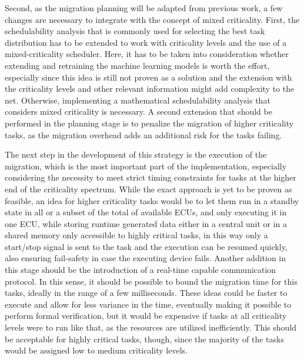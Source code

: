 Second, as the migration planning will be adapted from previous work, a few changes are necessary to integrate with the concept of mixed criticality. First, the schedulability analysis that is commonly used for selecting the best task distribution has to be extended to work with criticality levels and the use of a mixed-criticality scheduler. Here, it has to be taken into consideration whether extending and retraining the machine learning models is worth the effort, especially since this idea is still not proven as a solution and the extension with the criticality levels and other relevant information might add complexity to the net. Otherwise, implementing a mathematical schedulability analysis that considers mixed criticality is necessary. A second extension that should be performed in the planning stage is to penalize the migration of higher criticality tasks, as the migration overhead adds an additional risk for the tasks failing.

The next step in the development of this strategy is the execution of the migration, which is the most important part of the implementation, especially considering the necessity to meet strict timing constraints for tasks at the higher end of the criticality spectrum. While the exact approach is yet to be proven as feasible, an idea for higher criticality tasks would be to let them run in a standby state in all or a subset of the total of available ECUs, and only executing it in one ECU, while storing runtime generated data either in a central unit or in a shared memory only accessible to highly critical tasks, in this way only a start/stop signal is sent to the task and the execution can be resumed quickly, also ensuring fail-safety in case the executing device fails. Another addition in this stage should be the introduction of a real-time capable communication protocol. In this sense, it should be possible to bound the migration time for this tasks, ideally in the range of a few milliseconds. These ideas could be faster to execute and allow for less variance in the time, eventually making it possible to perform formal verification, but it would be expensive if tasks at all criticality levels were to run like that, as the resources are utilized inefficiently. This should be acceptable for highly critical tasks, though, since the majority of the tasks would be assigned low to medium criticality levels.

